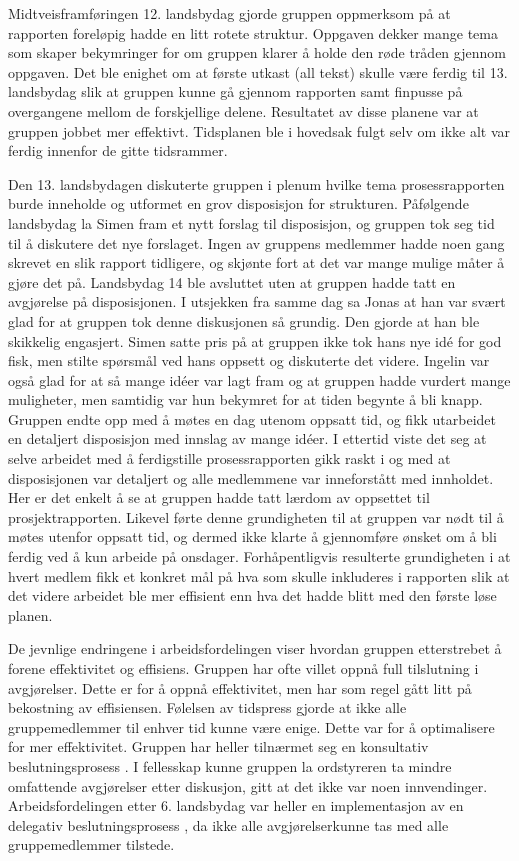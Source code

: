 Midtveisframføringen 12. landsbydag gjorde gruppen oppmerksom på at rapporten foreløpig hadde en litt rotete struktur.
Oppgaven dekker mange tema som skaper bekymringer for om gruppen klarer å holde den røde tråden gjennom oppgaven.
Det ble enighet om at første utkast (all tekst) skulle være ferdig til 13. landsbydag slik at gruppen kunne gå gjennom rapporten samt finpusse på overgangene mellom de forskjellige delene.
Resultatet av disse planene var at gruppen jobbet mer effektivt.
Tidsplanen ble i hovedsak fulgt selv om ikke alt var ferdig innenfor de gitte tidsrammer. 

Den 13. landsbydagen diskuterte gruppen i plenum hvilke tema prosessrapporten burde inneholde og utformet en grov disposisjon for strukturen.
Påfølgende landsbydag la Simen fram et nytt forslag til disposisjon, og gruppen tok seg tid til å diskutere det nye forslaget.
Ingen av gruppens medlemmer hadde noen gang skrevet en slik rapport tidligere, og skjønte fort at det var mange mulige måter å gjøre det på.
Landsbydag 14 ble avsluttet uten at gruppen hadde tatt en avgjørelse på disposisjonen.
I utsjekken fra samme dag sa Jonas at han var svært glad for at gruppen tok denne diskusjonen så grundig.
Den gjorde at han ble skikkelig engasjert.
Simen satte pris på at gruppen ikke tok hans nye id\'{e} for god fisk, men stilte spørsmål ved hans oppsett og diskuterte det videre.
Ingelin var også glad for at så mange id\'{e}er var lagt fram og at gruppen hadde vurdert mange muligheter, men samtidig var hun bekymret for at tiden begynte å bli knapp.
Gruppen endte opp med å møtes en dag utenom oppsatt tid, og fikk utarbeidet en detaljert disposisjon med innslag av mange id\'{e}er.
I ettertid viste det seg at selve arbeidet med å ferdigstille prosessrapporten gikk raskt i og med at disposisjonen var detaljert og alle medlemmene var inneforstått med innholdet.
Her er det enkelt å se at gruppen hadde tatt lærdom av oppsettet til prosjektrapporten.
Likevel førte denne grundigheten til at gruppen var nødt til å møtes utenfor oppsatt tid, og dermed ikke klarte å gjennomføre ønsket om å bli ferdig ved å kun arbeide på onsdager.
Forhåpentligvis resulterte grundigheten i at hvert medlem fikk et konkret mål på hva som skulle inkluderes i rapporten slik at det videre arbeidet ble mer effisient enn hva det hadde blitt med den første løse planen. 

De jevnlige endringene i arbeidsfordelingen viser hvordan gruppen etterstrebet å forene effektivitet og effisiens.
Gruppen har ofte villet oppnå full tilslutning i avgjørelser.
Dette er for å oppnå effektivitet, men har som regel gått litt på bekostning av effisiensen.
Følelsen av tidspress gjorde at ikke alle gruppemedlemmer til enhver tid kunne være enige.
Dette var for å optimalisere for mer effektivitet.
Gruppen har heller tilnærmet seg en konsultativ beslutningsprosess \cite{schwarz}.
I fellesskap kunne gruppen la ordstyreren ta mindre omfattende avgjørelser etter diskusjon, gitt at det ikke var noen innvendinger.
Arbeidsfordelingen etter 6. landsbydag var heller en implementasjon av en delegativ beslutningsprosess \cite{schwarz}, da ikke alle avgjørelserkunne tas med alle gruppemedlemmer tilstede.


